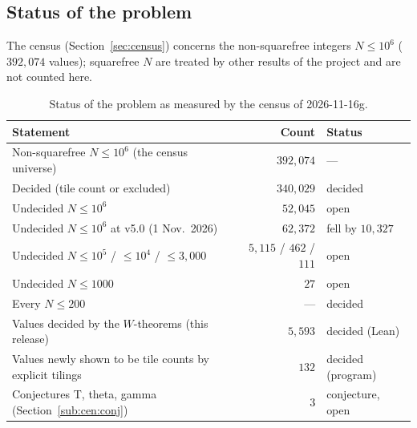 \documentclass[11pt,reqno]{amsart}
\theoremstyle{plain}
\theoremstyle{definition}
\begin{document}
\subsection{Status of the problem}\label{sub:intro:status}
The census (Section~\ref{sec:census}) concerns the non-squarefree integers $N\le10^6$ ($392{,}074$ values); squarefree $N$
are treated by other results of the project and are not counted here.
\begin{table}[h]
\centering\small
\begin{tabular}{@{}p{7.4cm}rp{3.6cm}@{}}
\hline
Statement & Count & Status\\\hline
Non-squarefree $N\le10^6$ (the census universe) & $392{,}074$ & ---\\
Decided (tile count or excluded) & $340{,}029$ & decided\\
Undecided $N\le10^6$ & $52{,}045$ & open\\
Undecided $N\le10^6$ at v5.0 (1 Nov.\ 2026) & $62{,}372$ & fell by $10{,}327$\\
Undecided $N\le10^5$ / $\le10^4$ / $\le3{,}000$ & $5{,}115$ / $462$ / $111$ & open\\
Undecided $N\le1000$ & $27$ & open\\
Every $N\le200$ & --- & decided\\
Values decided by the $W$-theorems (this release) & $5{,}593$ & decided (Lean)\\
Values newly shown to be tile counts by explicit tilings & $132$ & decided (program)\\
Conjectures T, theta, gamma (Section~\ref{sub:cen:conj}) & $3$ & conjecture, open\\\hline
\end{tabular}
\caption{Status of the problem as measured by the census of 2026-11-16g.}
\label{tab:status}
\end{table}
\end{document}

